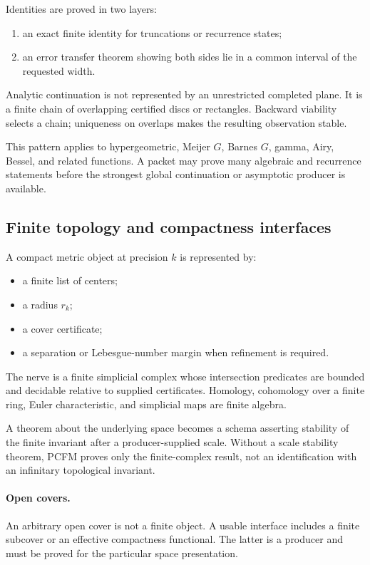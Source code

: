 Identities are proved in two layers:
\begin{enumerate}
\item an exact finite identity for truncations or recurrence states;
\item an error transfer theorem showing both sides lie in a common interval
of the requested width.
\end{enumerate}
Analytic continuation is not represented by an unrestricted completed plane.
It is a finite chain of overlapping certified discs or rectangles.  Backward
viability selects a chain; uniqueness on overlaps makes the resulting
observation stable.

This pattern applies to hypergeometric, Meijer \(G\), Barnes \(G\), gamma,
Airy, Bessel, and related functions.  A packet may prove many algebraic and
recurrence statements before the strongest global continuation or asymptotic
producer is available.

\subsection{Finite topology and compactness interfaces}

A compact metric object at precision \(k\) is represented by:
\begin{itemize}
\item a finite list of centers;
\item a radius \(r_k\);
\item a cover certificate;
\item a separation or Lebesgue-number margin when refinement is required.
\end{itemize}
The nerve is a finite simplicial complex whose intersection predicates are
bounded and decidable relative to supplied certificates.  Homology,
cohomology over a finite ring, Euler characteristic, and simplicial maps are
finite algebra.

A theorem about the underlying space becomes a schema asserting stability of
the finite invariant after a producer-supplied scale.  Without a scale
stability theorem, PCFM proves only the finite-complex result, not an
identification with an infinitary topological invariant.

\paragraph{Open covers.}
An arbitrary open cover is not a finite object.  A usable interface includes a
finite subcover or an effective compactness functional.  The latter is a
producer and must be proved for the particular space presentation.

